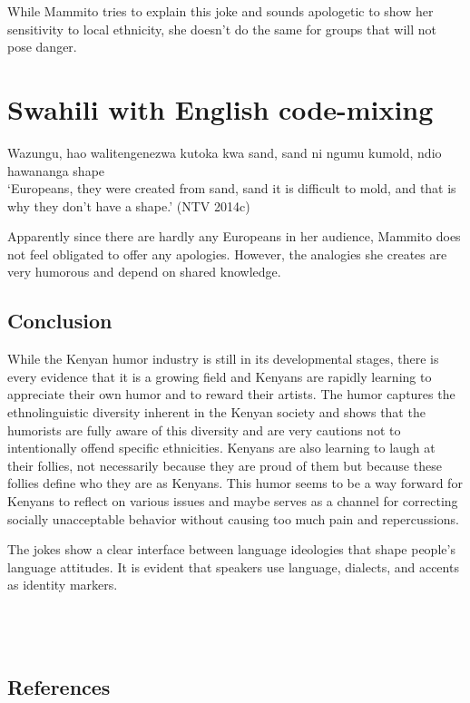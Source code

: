 \documentclass[output=paper]{langsci/langscibook}
\begin{document}
   While Mammito tries to explain this joke and sounds apologetic to show her sensitivity to local ethnicity, she doesn’t do the same for groups that will not pose danger. 

\chapter{Swahili with English code-mixing}
\gll Wazungu, hao walitengenezwa kutoka kwa sand, sand ni ngumu kumold, ndio hawananga shape \\
\glt ‘Europeans, they were created from sand, sand it is difficult to mold, and that is why they don’t have a shape.’ (NTV 2014c)
\z

Apparently since there are hardly any Europeans in her audience, Mammito does not feel obligated to offer any apologies. However, the analogies she creates are very humorous and depend on shared knowledge. 

\section{ Conclusion}

   While the Kenyan humor industry is still in its developmental stages, there is every evidence that it is a growing field and Kenyans are rapidly learning to appreciate their own humor and to reward their artists. The humor captures the ethnolinguistic diversity inherent in the Kenyan society and shows that the humorists are fully aware of this diversity and are very cautions not to intentionally offend specific ethnicities. Kenyans are also learning to laugh at their follies, not necessarily because they are proud of them but because these follies define who they are as Kenyans. This humor seems to be a way forward for Kenyans to reflect on various issues and maybe serves as a channel for correcting socially unacceptable behavior without causing too much pain and repercussions.

   The jokes show a clear interface between language ideologies that shape people’s language attitudes. It is evident that speakers use language, dialects, and accents as identity markers. \\
\\
\\
\\

\section{ References }
\end{document}
